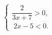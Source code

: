 \begin{ex}[type=ineq_system]
	\begin{condition}
		$\begin{cases} \dfrac{2}{3x + 7}>0  ,\\
			\;   2x - 5<0.
		\end{cases}$
	\end{condition}
\end{ex}
